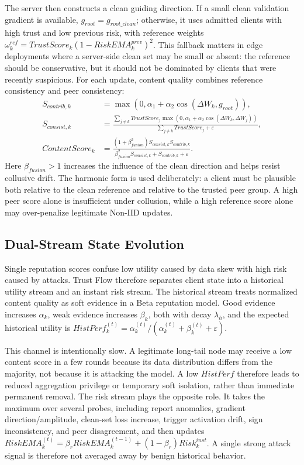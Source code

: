\documentclass[runningheads,orivec]{llncs}
\begin{document}
The server then constructs a clean guiding direction. If a small clean validation gradient is available, $g_{root}=g_{root\_clean}$; otherwise, it uses admitted clients with high trust and low previous risk, with reference weights $\omega_k^{ref}=TrustScore_k(1-RiskEMA_k^{prev})^2$. This fallback matters in edge deployments where a server-side clean set may be small or absent: the reference should be conservative, but it should not be dominated by clients that were recently suspicious. For each update, content quality combines reference consistency and peer consistency:
\begin{align}
S_{contrib,k}&=\max(0,\alpha_1+\alpha_2\cos(\Delta W_k,g_{root})),\\
S_{consist,k}&=\frac{\sum_{j\ne k}TrustScore_j\max(0,\alpha_1+\alpha_2\cos(\Delta W_k,\Delta W_j))}
{\sum_{j\ne k}TrustScore_j+\varepsilon},\\
ContentScore_k&=\frac{(1+\beta_{fusion}^2)S_{consist,k}S_{contrib,k}}
{\beta_{fusion}^2S_{consist,k}+S_{contrib,k}+\varepsilon}.
\end{align}
Here $\beta_{fusion}>1$ increases the influence of the clean direction and helps resist collusive drift. The harmonic form is used deliberately: a client must be plausible both relative to the clean reference and relative to the trusted peer group. A high peer score alone is insufficient under collusion, while a high reference score alone may over-penalize legitimate Non-IID updates.

\subsection{Dual-Stream State Evolution}

Single reputation scores confuse low utility caused by data skew with high risk caused by attacks. Trust Flow therefore separates client state into a historical utility stream and an instant risk stream. The historical stream treats normalized content quality as soft evidence in a Beta reputation model. Good evidence increases $\alpha_k$, weak evidence increases $\beta_k$, both with decay $\lambda_h$, and the expected historical utility is $HistPerf_k^{(t)}=\alpha_k^{(t)}/(\alpha_k^{(t)}+\beta_k^{(t)}+\varepsilon)$.

This channel is intentionally slow. A legitimate long-tail node may receive a low content score in a few rounds because its data distribution differs from the majority, not because it is attacking the model. A low $HistPerf$ therefore leads to reduced aggregation privilege or temporary soft isolation, rather than immediate permanent removal. The risk stream plays the opposite role. It takes the maximum over several probes, including report anomalies, gradient direction/amplitude, clean-set loss increase, trigger activation drift, sign inconsistency, and peer disagreement, and then updates $RiskEMA_k^{(t)}=\beta_rRiskEMA_k^{(t-1)}+(1-\beta_r)Risk_k^{inst}$. A single strong attack signal is therefore not averaged away by benign historical behavior.
\end{document}
